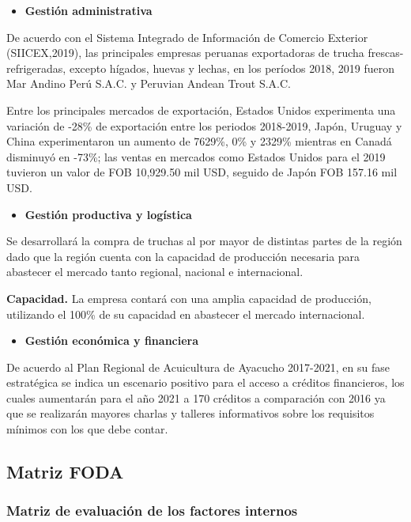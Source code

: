 \documentclass[
  stu,
  floatsintext,
  longtable,
  a4paper,
  nolmodern,
  notxfonts,
  notimes,
  12pt,
  colorlinks=true,linkcolor=blue,citecolor=blue,urlcolor=blue]{apa7}
\providecommand{\tightlist}{%
  \setlength{\itemsep}{0pt}\setlength{\parskip}{0pt}}
\begin{document}
\begin{itemize}
\tightlist
\item
  \textbf{Gestión administrativa}
\end{itemize}

De acuerdo con el Sistema Integrado de Información de Comercio Exterior
(SIICEX,2019), las principales empresas peruanas exportadoras de trucha
frescas-refrigeradas, excepto hígados, huevas y lechas, en los períodos
2018, 2019 fueron Mar Andino Perú S.A.C. y Peruvian Andean Trout S.A.C.

Entre los principales mercados de exportación, Estados Unidos
experimenta una variación de -28\% de exportación entre los periodos
2018-2019, Japón, Uruguay y China experimentaron un aumento de 7629\%,
0\% y 2329\% mientras en Canadá disminuyó en -73\%; las ventas en
mercados como Estados Unidos para el 2019 tuvieron un valor de FOB
10,929.50 mil USD, seguido de Japón FOB 157.16 mil USD.

\begin{itemize}
\tightlist
\item
  \textbf{Gestión productiva y logística}
\end{itemize}

Se desarrollará la compra de truchas al por mayor de distintas partes de
la región dado que la región cuenta con la capacidad de producción
necesaria para abastecer el mercado tanto regional, nacional e
internacional.

\textbf{Capacidad.} La empresa contará con una amplia capacidad de
producción, utilizando el 100\% de su capacidad en abastecer el mercado
internacional.

\begin{itemize}
\tightlist
\item
  \textbf{Gestión económica y financiera}
\end{itemize}

De acuerdo al Plan Regional de Acuicultura de Ayacucho 2017-2021, en su
fase estratégica se indica un escenario positivo para el acceso a
créditos financieros, los cuales aumentarán para el año 2021 a 170
créditos a comparación con 2016 ya que se realizarán mayores charlas y
talleres informativos sobre los requisitos mínimos con los que debe
contar.

\subsection{Matriz FODA}\label{matriz-foda}

\subsubsection{Matriz de evaluación de los factores
internos}\label{matriz-de-evaluaciuxf3n-de-los-factores-internos}
\end{document}
